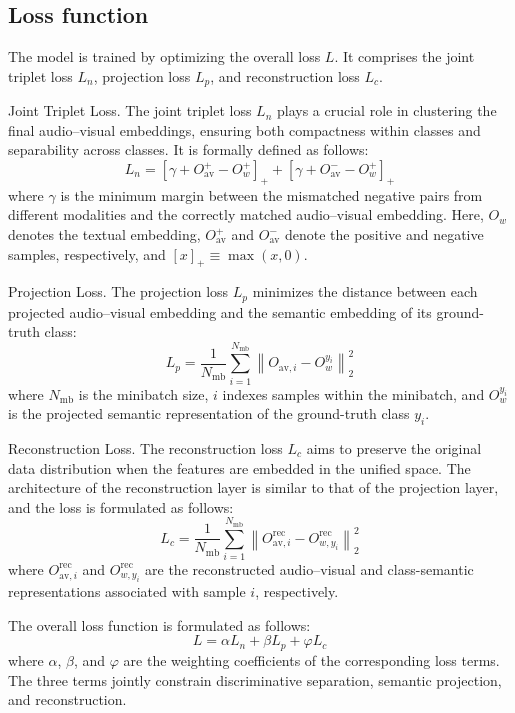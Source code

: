 \documentclass[10pt,journal,twoside]{IEEEtran}
\begin{document}
\subsection{Loss function}
The model is trained by optimizing the overall loss $L$. It comprises the joint triplet loss $L_n$, projection loss $L_p$, and reconstruction loss $L_c$.


Joint Triplet Loss. The joint triplet loss $L_n$ plays a crucial role in clustering the final audio–visual embeddings, ensuring both compactness within classes and separability across classes. It is formally defined as follows:
\begin{equation}
L_n = \left[ \gamma + O_{\text{av}}^+ - O_w^+ \right]_+ + \left[ \gamma + O_{\text{av}}^- - O_w^+ \right]_+
\end{equation}
where $\gamma$ is the minimum margin between the mismatched negative pairs from different modalities and the correctly matched audio–visual embedding. Here, $O_w$ denotes the textual embedding, $O_{\text{av}}^+$ and $O_{\text{av}}^-$ denote the positive and negative samples, respectively, and $\left[ x \right]_+ \equiv \max(x,0)$.


Projection Loss. The projection loss $L_p$ minimizes the distance between each projected audio--visual embedding and the semantic embedding of its ground-truth class:
\begin{equation}
L_p=\frac{1}{N_{\mathrm{mb}}}\sum_{i=1}^{N_{\mathrm{mb}}}
\left\|O_{\mathrm{av},i}-O_w^{y_i}\right\|_2^2
\end{equation}
where $N_{\mathrm{mb}}$ is the minibatch size, $i$ indexes samples within the minibatch, and $O_w^{y_i}$ is the projected semantic representation of the ground-truth class $y_i$.


Reconstruction Loss. The reconstruction loss $L_c$ aims to preserve the original data distribution when the features are embedded in the unified space. The architecture of the reconstruction layer is similar to that of the projection layer, and the loss is formulated as follows:
\begin{equation}
L_c=\frac{1}{N_{\mathrm{mb}}}\sum_{i=1}^{N_{\mathrm{mb}}}
\left\|O_{\mathrm{av},i}^{\mathrm{rec}}-O_{w,y_i}^{\mathrm{rec}}\right\|_2^2
\end{equation}
where $O_{\mathrm{av},i}^{\mathrm{rec}}$ and $O_{w,y_i}^{\mathrm{rec}}$ are the reconstructed audio--visual and class-semantic representations associated with sample $i$, respectively.


The overall loss function is formulated as follows:
\begin{equation}
\label{eq:total_loss}
L=\alpha L_n+\beta L_p+\varphi L_c
\end{equation}
where $\alpha$, $\beta$, and $\varphi$ are the weighting coefficients of the corresponding loss terms. The three terms jointly constrain discriminative separation, semantic projection, and reconstruction.
\end{document}
